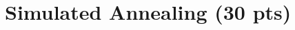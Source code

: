 \documentclass[conference]{../IEEEtran}
\begin{document}
\section{Simulated Annealing (30 pts)} \label{prob4} %

~\cite{caserta2007}


{}


%
%
%
%
%
%
\end{document}
